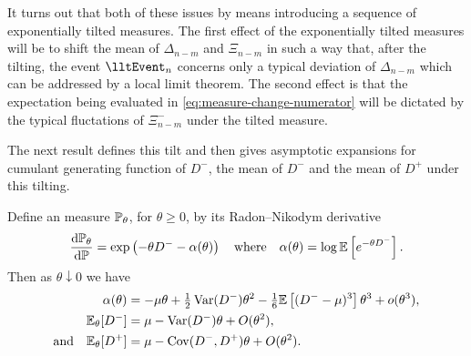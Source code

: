It turns out that both of these issues by means introducing a sequence of exponentially tilted measures.  The first effect of the exponentially tilted measures will be to shift the mean of $\Delta_{n-m}$ and $\Xi_{n-m}$ in such a way that, after the tilting, the event $\lltEvent_n$ concerns only a typical deviation of $\Delta_{n-m}$ which can be addressed by a local limit theorem. The second effect is that the expectation being evaluated in \cref{eq:measure-change-numerator} will be dictated by the typical fluctations of $\Xi^-_{n-m}$ under the tilted measure. 

The next result defines this tilt and then gives asymptotic expansions for cumulant generating function of $D^-$, the mean of $D^-$ and the mean of $D^+$ under this tilting. 
\begin{lemma}
    \label{lem:asym-expansions}
    Define an measure $\P_{\theta}$, for $\theta \geq 0$, by its Radon--Nikodym derivative
    \begin{equation*}
        \diff{\P_{\theta}}{\P} = \exp\left( - \theta D^- - \alpha(\theta) \right)
        \quad \text{where} \quad
        \alpha(\theta) = \log \E \left[ e^{-\theta D^-} \right].
    \end{equation*}
    Then as $\theta \downarrow 0$ we have
    \begin{align*}
        \alpha(\theta) &= -\mu \theta + \tfrac{1}{2}\var(D^-) \theta^2 - \tfrac{1}{6} \E \left[ (D^- - \mu)^3 \right] \theta^3 + \littleo(\theta^3), \\
        \E_{\theta}[D^-] &= \mu - \var(D^-) \theta + \bigo(\theta^2), \\
        \text{and} \quad \E_{\theta}[D^+] &= \mu - \cov(D^-, D^+) \theta + \bigo(\theta^2).
    \end{align*}
\end{lemma}
